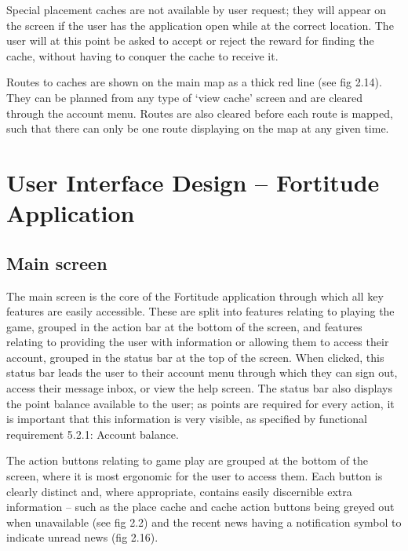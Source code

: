 Special placement caches are not available by user request; they will appear on the screen if the user has the application open while at the correct location. The user will at this point be asked to accept or reject the reward for finding the cache, without having to conquer the cache to receive it.

Routes to caches are shown on the main map as a thick red line (see fig 2.14). They can be planned from any type of ‘view cache’ screen and are cleared through the account menu. Routes are also cleared before each route is mapped, such that there can only be one route displaying on the map at any given time.


\section{User Interface Design – Fortitude Application}

\subsection{Main screen}


The main screen is the core of the Fortitude application through which all key features are easily accessible. These are split into features relating to playing the game, grouped in the action bar at the bottom of the screen, and features relating to providing the user with information or allowing them to access their account, grouped in the status bar at the top of the screen. When clicked, this status bar leads the user to their account menu through which they can sign out, access their message inbox, or view the help screen. The status bar also displays the point balance available to the user; as points are required for every action, it is important that this information is very visible, as specified by functional requirement 5.2.1: Account balance.

The action buttons relating to game play are grouped at the bottom of the screen, where it is most ergonomic for the user to access them. Each button is clearly distinct and, where appropriate, contains easily discernible extra information – such as the place cache and cache action buttons being greyed out when unavailable (see fig 2.2) and the recent news having a notification symbol to indicate unread news (fig 2.16). 

